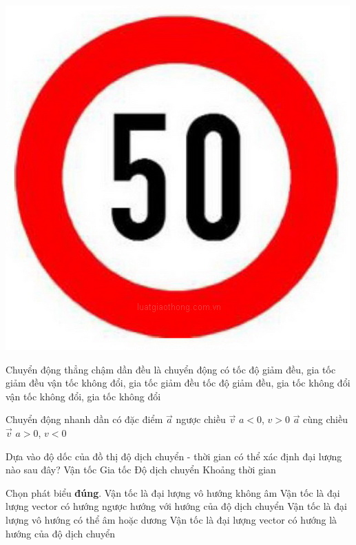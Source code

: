 \begin{ex}
	{
		\includegraphics[width=0.4\linewidth]{../figs/D10-1-6}
	}
	\loigiai{}
\end{ex}
\begin{ex}
	Chuyển động thẳng chậm dần đều là chuyển động có
	\choice
	{tốc độ giảm đều, gia tốc giảm đều}
	{vận tốc không đổi, gia tốc giảm đều}
	{\True tốc độ giảm đều, gia tốc không đổi}
	{vận tốc không đổi, gia tốc không đổi}
	\loigiai{}
\end{ex}
\begin{ex}
	Chuyển động nhanh dần có đặc điểm
	\choice
	{$\vec{a}$ ngược chiều $\vec{v}$}
	{$a<0$, $v>0$}
	{\True $\vec{a}$ cùng chiều $\vec{v}$}
	{$a>0$, $v<0$}
	\loigiai{}
\end{ex}
\begin{ex}
	Dựa vào độ dốc của đồ thị độ dịch chuyển - thời gian có thể xác định đại lượng nào sau đây?
	\choice
	{\True Vận tốc}
	{Gia tốc}
	{Độ dịch chuyển}
	{Khoảng thời gian}
	\loigiai{}
\end{ex}
\begin{ex}
	Chọn phát biểu \textbf{đúng}.
	\choice
	{Vận tốc là đại lượng vô hướng không âm}
	{Vận tốc là đại lượng vector có hướng ngược hướng với hướng của độ dịch chuyển}
	{Vận tốc là đại lượng vô hướng có thể âm hoặc dương}
	{\True Vận tốc là đại lượng vector có hướng là hướng của độ dịch chuyển}
	\loigiai{}
\end{ex}
